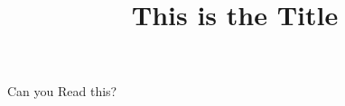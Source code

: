 \documentclass{ximera}
\title{This is the Title}
\begin{document}
\maketitle
Can you Read this?
\end{document}
